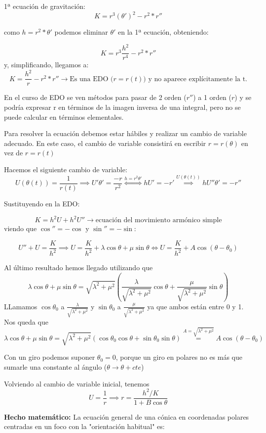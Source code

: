 1ª ecuación de gravitación:
\[K= r^3(\theta')^2 -r^2*r''\]

como $h = r^2*\theta'$ podemos eliminar $\theta'$ en la 1ª ecuación, obteniendo:

$$K= r^3 \frac{h^2}{r^4} - r^2*r''$$
y, simplificando, llegamos a:
$$K= \frac{h^2}{r} - r^2*r''  \rightarrow  \text{Es una EDO ($r = r(t)$) y no aparece explícitamente la t.}$$

\obs En el curso de EDO se ven métodos para pasar de 2 orden ($r''$) a 1 orden ($r$) y se podría expresar r en términos de la imagen inversa de una integral, pero no se puede calcular en términos elementales.

Para resolver la ecuación debemos estar hábiles y realizar un cambio de variable adecuado. En este caso, el cambio de variable consistirá en escribir $r=r(\theta)$ en vez de $r=r(t)$

Hacemos el siguiente cambio de variable:
$$U(\theta(t)) = \frac{1}{r(t)} \implies U'\theta' = \frac{-r}{r^2} \stackrel{h=r^2\theta' }{\iff} hU' = -r' \stackrel{U(\theta(t))}{\implies} hU''\theta' = -r''$$

Sustituyendo en la EDO:

$$K= h^2U + h^2U'' \rightarrow \text{ecuación del movimiento armónico simple}$$
viendo que $\cos'' = -\cos$ y $\sin'' = -\sin$:

$$U'' + U = \frac{K}{h^2} \implies U= \frac{K}{h^2} + \lambda\cos\theta + \mu\sin\theta \iff U= \frac{K}{h^2} + A\cos(\theta - \theta_0)$$
\begin{mdframed}
\obs Al último resultado hemos llegado utilizando que
$$ \lambda\cos\theta + \mu\sin\theta = \sqrt{\lambda^2 + \mu^2}\left(\frac{\lambda}{\sqrt{\lambda^2 + \mu^2}}\cos\theta  +\frac{\mu}{ \sqrt{\lambda^2 + \mu^2}}\sin\theta\right)$$
LLamamos $\cos\theta_0$ a $\frac{\lambda}{ \sqrt{\lambda^2 + \mu^2}}$ y $\sin\theta_0$ a $\frac{\mu}{ \sqrt{\lambda^2 + \mu^2}}$ ya que ambos están entre 0 y 1.
Nos queda que
$$\lambda\cos\theta + \mu\sin\theta = \sqrt{\lambda^2 + \mu^2}(\cos\theta_0\cos\theta + \sin\theta_0\sin\theta) \stackrel{A=\sqrt{\lambda^2 + \mu^2}}{=} A\cos(\theta - \theta_0)$$
\end{mdframed}
Con un giro podemos suponer $\theta_0 = 0$, porque un giro en polares no es más que sumarle una constante al ángulo ($\theta \rightarrow \theta + cte$)

Volviendo al cambio de variable inicial, tenemos
\[U = \frac{1}{r} \implies r=\frac{h^2/K}{1 + B\cos\theta}\]

\textbf{Hecho matemático:} La ecuación general de una cónica en coordenadas polares centradas en un foco con la "orientación habitual" es:

